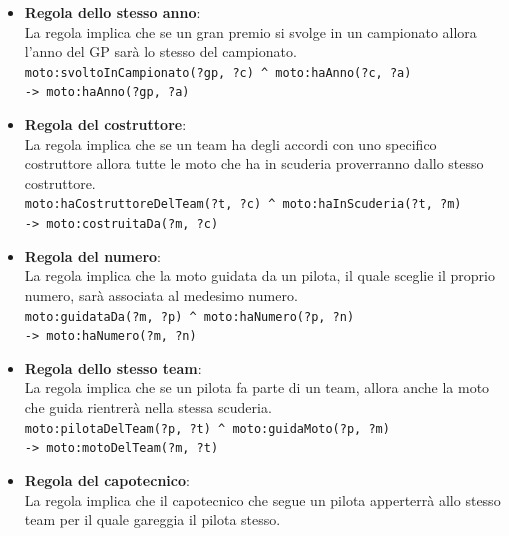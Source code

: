 \begin{itemize}
  \item \textbf{Regola dello stesso anno}:\\
  
  La regola implica che se un gran premio si svolge in un campionato allora l'anno del GP sarà lo stesso del campionato.\\

  \texttt{moto:svoltoInCampionato(?gp, ?c) \textasciicircum\ moto:haAnno(?c, ?a)\\-> moto:haAnno(?gp, ?a)}

  \item \textbf{Regola del costruttore}:\\
  
  La regola implica che se un team ha degli accordi con uno specifico costruttore allora tutte le moto che ha in scuderia proverranno dallo stesso costruttore.\\

  \texttt{moto:haCostruttoreDelTeam(?t, ?c) \textasciicircum\ moto:haInScuderia(?t, ?m)\\-> moto:costruitaDa(?m, ?c)}

  \item \textbf{Regola del numero}:\\
  
  La regola implica che la moto guidata da un pilota, il quale sceglie il proprio numero, sarà associata al medesimo numero.\\

  \texttt{moto:guidataDa(?m, ?p) \textasciicircum\ moto:haNumero(?p, ?n)\\-> moto:haNumero(?m, ?n)}

  \item \textbf{Regola dello stesso team}:\\
  
  La regola implica che se un pilota fa parte di un team, allora anche la moto che guida rientrerà nella stessa scuderia.\\

  \texttt{moto:pilotaDelTeam(?p, ?t) \textasciicircum\ moto:guidaMoto(?p, ?m)\\-> moto:motoDelTeam(?m, ?t)}

  \item \textbf{Regola del capotecnico}:\\
  
  La regola implica che il capotecnico che segue un pilota apperterrà allo stesso team per il quale gareggia il pilota stesso.\\


\end{itemize}

